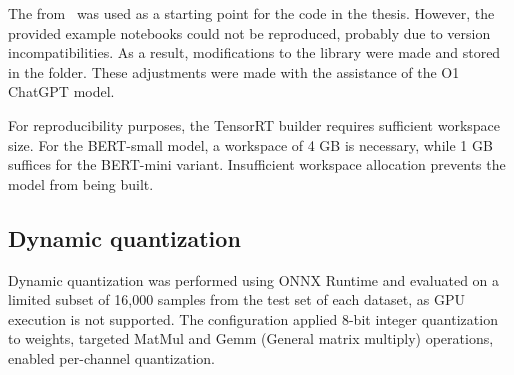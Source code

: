 \begin{table}[H]
    \centering
    \caption{Impact of calibration percentile on validation performance (BERT-small)}
    \label{tab:static_quant_percentiles}
\end{table}

The  from~\cite{els-rd_transformer-deploy_2025} was used as a starting point for the code in the thesis. However, the provided example notebooks could not be reproduced, probably due to version incompatibilities. As a result, modifications to the library were made and stored in the  folder. These adjustments were made with the assistance of the O1 ChatGPT model.

For reproducibility purposes, the TensorRT builder requires sufficient workspace size. For the BERT-small model, a workspace of 4 GB is necessary, while 1 GB suffices for the BERT-mini variant. Insufficient workspace allocation prevents the model from being built.

\subsection{Dynamic quantization}
\label{sec:dynamic_quant_experiments}

Dynamic quantization was performed using ONNX Runtime and evaluated on a limited subset of 16,000 samples from the test set of each dataset, as GPU execution is not supported. The configuration applied 8-bit integer quantization to weights, targeted MatMul and Gemm (General matrix multiply) operations, enabled per-channel quantization.

